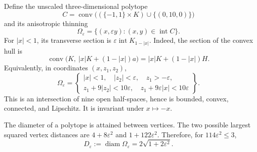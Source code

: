 \documentclass[11pt,a4paper]{article}
\theoremstyle{remark}
\newcommand{\eps}{\varepsilon}
\newcommand{\diam}{\operatorname{diam}}
\newcommand{\conv}{\operatorname{conv}}
\begin{document}
Define the unscaled three-dimensional polytope
\[
 C=\conv\bigl((\{-1,1\}\times K)\cup\{(0,10,0)\}\bigr)
\]
and its anisotropic thinning
\begin{equation}\label{eq:domain}
 \Omega_\eps=\{(x,\eps y):(x,y)\in\operatorname{int}C\}.
\end{equation}
For $|x|<1$, its transverse section is $\eps\operatorname{int}K_{1-|x|}$. Indeed, the section of the convex hull is
\[
 \conv\bigl(K,\ |x|K+(1-|x|)a\bigr)
 =|x|K+(1-|x|)H.
\]
Equivalently, in coordinates $(x,z_1,z_2)$,
\begin{equation}\label{eq:halfspaces}
 \Omega_\eps=\left\{
 \begin{array}{l}
 |x|<1,\quad |z_2|<\eps,\quad z_1>-\eps,\\
 z_1+9|z_2|<10\eps,\quad z_1+9\eps|x|<10\eps
 \end{array}\right\}.
\end{equation}
This is an intersection of nine open half-spaces, hence is bounded, convex, connected, and Lipschitz. It is invariant under $x\mapsto-x$.

The diameter of a polytope is attained between vertices. The two possible largest squared vertex distances are $4+8\eps^2$ and $1+122\eps^2$. Therefore, for $114\eps^2\le3$,
\begin{equation}\label{eq:diam}
 D_\eps:=\diam\Omega_\eps=2\sqrt{1+2\eps^2}.
\end{equation}
\end{document}
